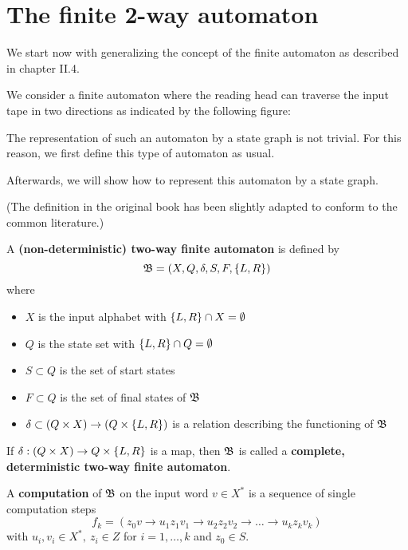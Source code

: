 \section{The finite 2-way automaton}

We start now with generalizing the concept of the finite automaton as described
in chapter II.4.

We consider a finite automaton where the reading head can traverse the input
tape in two directions as indicated by the following figure:

\begin{center}

\end{center}

The representation of such an automaton by a state graph is not trivial. For
this reason, we first define this type of automaton as usual.

Afterwards, we will show how to represent this automaton by a state graph.

(The definition in the original book has been slightly adapted to conform to
the common literature.)

\begin{definition}
A {\bf (non-deterministic) two-way finite automaton} is defined by
\[ \mbox{$\mathfrak{B}$} = (X, Q, \delta, S, F, \mbox{$\{L, R\}$}) \]
where 
\begin{itemize}
  \item $X$ is the input alphabet with $\mbox{$\{L, R\}$} \cap X = \emptyset$
  \item $Q$ is the state set with $\mbox{$\{L, R\}$} \cap Q = \emptyset$
  \item $S \subset Q$ is the set of start states
  \item $F \subset Q$ is the set of final states of $\mbox{$\mathfrak{B}$}$
  \item $\delta \subset (Q \times X) \to (Q \times \mbox{$\{L, R\}$})$ is a
  relation describing the functioning of $\mbox{$\mathfrak{B}$}$
\end{itemize}

If $\delta : (Q \times X) \to Q \times \mbox{$\{L, R\}$}$ is a map, then
$\mbox{$\mathfrak{B}$}$ is called a {\bf complete, deterministic two-way finite automaton}.
\end{definition}

\bigskip
\begin{definition}
A {\bf computation} of $\mbox{$\mathfrak{B}$}$ on the input word $v \in X^*$ is a sequence of
single computation steps
\[ f_k = (z_0 v \to u_1 z_1 v_1 \to u_2 z_2 v_2 \to \ldots \to u_k z_k v_k) \]
with $u_i, v_i \in X^*,\ z_i \in Z$ for $i = 1, \ldots, k$ and $z_0 \in S$. 
\end{definition}

